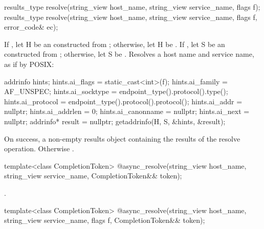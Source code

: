\begin{itemdecl}
results_type resolve(string_view host_name, string_view service_name,
                     flags f);
results_type resolve(string_view host_name, string_view service_name,
                     flags f, error_code& ec);
\end{itemdecl}

\begin{itemdescr}
\pnum
\effects If , let H be an \ntbs constructed from ; otherwise, let H be . If , let S be an \ntbs constructed from ; otherwise, let S be . Resolves a host name and service name, as if by POSIX:
\begin{codeblock}
addrinfo hints;
hints.ai_flags = static_cast<int>(f);
hints.ai_family = AF_UNSPEC;
hints.ai_socktype = endpoint_type().protocol().type();
hints.ai_protocol = endpoint_type().protocol().protocol();
hints.ai_addr = nullptr;
hints.ai_addrlen = 0;
hints.ai_canonname = nullptr;
hints.ai_next = nullptr;
addrinfo* result = nullptr;
getaddrinfo(H, S, &hints, &result);
\end{codeblock}


\pnum
\returns On success, a non-empty results object containing the results of the resolve operation. Otherwise .
\end{itemdescr}

\begin{itemdecl}
template<class CompletionToken>
  @\DEDUCED@ async_resolve(string_view host_name, string_view service_name,
                        CompletionToken&& token);
\end{itemdecl}

\begin{itemdescr}
\pnum
\returns {}.
\end{itemdescr}

\begin{itemdecl}
template<class CompletionToken>
  @\DEDUCED@ async_resolve(string_view host_name, string_view service_name,
                        flags f, CompletionToken&& token);
\end{itemdecl}

